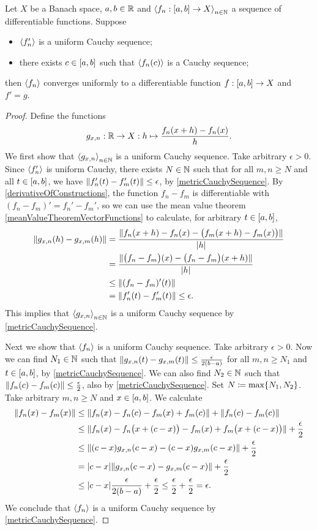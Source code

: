 \begin{proposition} \label{derivativeOfUniformLimit}
Let $X$ be a Banach space, $a,b\in \mathbb{R}$ and $\seq{f_n: \interval{a,b} \to X}_{n\in\N}$ a sequence of differentiable functions. Suppose
\begin{itemize}
\item $\left\langle f_n' \right\rangle$ is a uniform Cauchy sequence;
\item there exists $c\in \interval{a,b}$ such that $\left\langle f_n(c) \right\rangle$ is a Cauchy sequence;
\end{itemize}
then $\left\langle f_n \right\rangle$ converges uniformly to a differentiable function $f: \interval{a,b}\to X$ and $f' = g$.
\end{proposition}
\begin{proof}
Define the functions
\[ g_{x,n}: \mathbb{R}\to X: h\mapsto \frac{f_n(x+h) - f_n(x)}{h}. \]
We first show that $\left\langle g_{x,n} \right\rangle_{n\in \mathbb{N}}$ is a uniform Cauchy sequence. Take arbitrary $\epsilon > 0$. Since $\left\langle f_n' \right\rangle$ is uniform Cauchy, there exists $N\in \mathbb{N}$ such that for all $m,n\geq N$ and all $t\in \interval{a,b}$, we have $\lVert f_n'(t) - f_m'(t)\rVert \leq \epsilon$, by \ref{metricCauchySequence}. By \ref{derivativeOfConstructions}, the function $f_n - f_m$ is differentiable with $(f_n - f_m)' = f_n' - f_m'$, so we can use the mean value theorem \ref{meanValueTheoremVectorFunctions} to calculate, for arbitrary $t\in \interval{a,b}$,
\begin{align*}
\lVert g_{x,n}(h) - g_{x,m}(h)\rVert &= \frac{\lVert f_n(x+h) - f_n(x) - \big(f_m(x+h) - f_m(x)\big)\rVert}{|h|} \\
&= \frac{\lVert\big(f_n - f_m\big)(x) - \big(f_n - f_m\big)(x+h)\rVert}{|h|} \\
&\leq \lVert(f_n - f_m)'(t)\rVert \\
&= \lVert f_n'(t) - f_m'(t)\rVert \leq \epsilon.
\end{align*}
This implies that $\left\langle g_{x,n} \right\rangle_{n\in \mathbb{N}}$ is a uniform Cauchy sequence by \ref{metricCauchySequence}.

Next we show that $\left\langle f_n \right\rangle$ is a uniform Cauchy sequence. Take arbitrary $\epsilon > 0$. Now we can find $N_1\in \mathbb{N}$ such that $\lVert g_{x,n}(t) - g_{x,m}(t)\rVert \leq \frac{\epsilon}{2(b-a)}$ for all $m,n\geq N_1$ and $t\in \interval{a,b}$, by \ref{metricCauchySequence}. We can also find $N_2 \in \mathbb{N}$ such that $\lVert f_n(c) - f_m(c)\rVert \leq \frac{\epsilon}{2}$, also by \ref{metricCauchySequence}. Set $N\coloneqq \max\{N_1, N_2\}$.
Take arbitrary $m,n\geq N$ and $x\in \interval{a,b}$. We calculate
\begin{align*}
\lVert f_n(x) - f_m(x)\rVert &\leq \lVert f_n(x) - f_n(c) - f_m(x) + f_m(c)\rVert + \lVert f_n(c) - f_m(c)\rVert \\
&\leq \lVert f_n(x) - f_n\big(x + (c-x)\big) - f_m(x) + f_m\big(x + (c-x)\big)\rVert + \frac{\epsilon}{2} \\
&\leq \lVert(c-x)g_{x,n}(c-x) - (c-x)g_{x,m}(c-x)\rVert + \frac{\epsilon}{2} \\
&= |c-x|\lVert g_{x,n}(c-x) - g_{x,m}(c-x)\rVert + \frac{\epsilon}{2} \\
&\leq |c-x|\frac{\epsilon}{2(b-a)} + \frac{\epsilon}{2} \leq \frac{\epsilon}{2}  + \frac{\epsilon}{2}  = \epsilon.
\end{align*}
We conclude that $\left\langle f_n \right\rangle$ is a uniform Cauchy sequence by \ref{metricCauchySequence}.


\end{proof}
